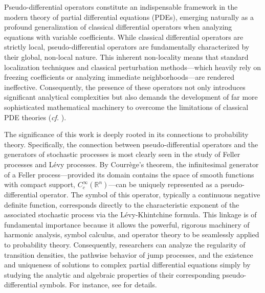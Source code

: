 \documentclass[11pt,reqno]{amsart}
\theoremstyle{definition}
\theoremstyle{remark}
\numberwithin{equation}{section}
\begin{document}
Pseudo-differential operators constitute an indispensable framework in the modern theory of partial differential equations (PDEs), emerging naturally as a profound generalization of classical differential operators when analyzing equations with variable coefficients. 
While classical differential operators are strictly local, pseudo-differential operators are fundamentally characterized by their global, non-local nature. 
This inherent non-locality means that standard localization techniques and classical perturbation methods—which heavily rely on freezing coefficients or analyzing immediate neighborhoods—are rendered ineffective. 
Consequently, the presence of these operators not only introduces significant analytical complexities but also demands the development of far more sophisticated mathematical machinery to overcome the limitations of classical PDE theories (\textit{cf.} \cite{E1,H1,K1,T1}).


The significance of this work is deeply rooted in its connections to probability theory. 
Specifically, the connection between pseudo-differential operators and the generators of stochastic processes is most clearly seen in the study of Feller processes and Lévy processes. 
By Courrège's theorem, the infinitesimal generator of a Feller process—provided its domain contains the space of smooth functions with compact support, $C_c^\infty(\mathbb{R}^n)$—can be uniquely represented as a pseudo-differential operator. 
The symbol of this operator, typically a continuous negative definite function, corresponds directly to the characteristic exponent of the associated stochastic process via the Lévy-Khintchine formula. 
This linkage is of fundamental importance because it allows the powerful, rigorous machinery of harmonic analysis, symbol calculus, and operator theory to be seamlessly applied to probability theory. 
Consequently, researchers can analyze the regularity of transition densities, the pathwise behavior of jump processes, and the existence and uniqueness of solutions to complex partial differential equations simply by studying the analytic and algebraic properties of their corresponding pseudo-differential symbols.
For instance, see \cite{A1,BGT1,J1,Kol1} for details.
\end{document}
